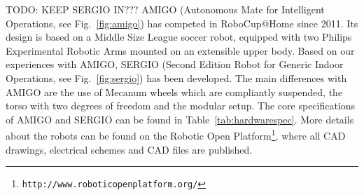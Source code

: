 TODO: KEEP SERGIO IN???
AMIGO (Autonomous Mate for Intelligent Operations, see Fig.~\ref{fig:amigo}) has competed in RoboCup@Home since 2011. Its design is based on a Middle Size League soccer robot, equipped with two Philips\texttrademark \hspace{0em} Experimental Robotic Arms mounted on an extensible upper body. Based on our experiences with AMIGO, SERGIO (Second Edition Robot for Generic Indoor Operations, see Fig.~\ref{fig:sergio}) has been developed. The main differences with AMIGO are the use of Mecanum wheels which are compliantly suspended, the torso with two degrees of freedom and the modular setup. The core specifications of AMIGO and SERGIO can be found in Table~\ref{tab:hardwarespec}. More details about the robots can be found on the Robotic Open Platform\footnote{\texttt{http://www.roboticopenplatform.org/}}, where all CAD drawings, electrical schemes and CAD files are published.

